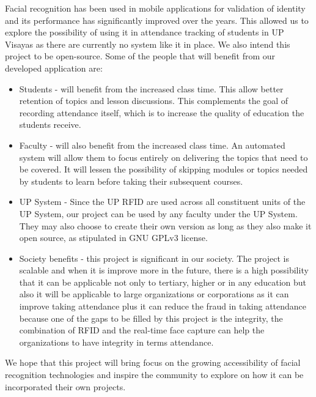 	Facial recognition has been used in mobile applications for validation of identity and its performance has significantly improved over the years. This allowed us to explore the possibility of using it in attendance tracking of students in UP Visayas as there are currently no system like it in place. We also intend this project to be open-source. Some of the people that will benefit from our developed application are:
	
	\begin{itemize}
		\item Students - will benefit from the increased class time. This allow better retention of topics and lesson discussions. This complements the goal of recording attendance itself, which is to increase the quality of education the students receive.
	\end{itemize}
	\begin{itemize}
		\item Faculty - will also benefit from the increased class time. An automated system will allow them to focus entirely on delivering the topics that need to be covered. It will lessen the possibility of skipping modules or topics needed by students to learn before taking their subsequent courses. 
	\end{itemize}
	\begin{itemize}
		\item UP System - Since the UP RFID are used across all constituent units of the UP System, our project can be used by any faculty under the UP System. They may also choose to create their own version as long as they also make it open source, as stipulated in GNU GPLv3 license.
	\end{itemize}
	\begin{itemize}
		\item Society benefits - this project is significant in our society. The project is scalable and when it is improve more in the future, there is a high possibility that it can be applicable not only to tertiary, higher or in any education but also it will be applicable to large organizations or corporations as it can improve taking attendance plus it can reduce the fraud in taking attendance because one of the gaps to be filled by this project is the integrity, the combination of RFID and the real-time face capture can help the organizations to have integrity in terms attendance. 
		
	\end{itemize}
	
	
	We hope that this project will bring focus on the growing accessibility of facial recognition technologies and inspire the community to explore on how it can be incorporated their own projects.
	
